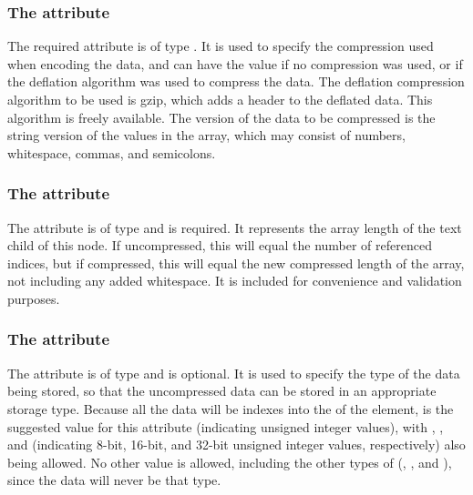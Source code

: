 \subsubsection{The \fixttspace{} attribute}
The required  attribute is of type . It is used to specify the compression used when encoding the data, and can have the value  if no compression was used, or  if the deflation algorithm was used to compress the data.  The deflation compression algorithm to be used is gzip, which adds a header to the deflated data.  This algorithm is freely available.  The version of the data to be compressed is the string version of the values in the array, which may consist of numbers, whitespace, commas, and semicolons.

\subsubsection{The \fixttspace{} attribute}
The  attribute is of type  and is required. It represents the array length of the  text child of this node.  If uncompressed, this will equal the number of referenced indices, but if compressed, this will equal the new compressed length of the array, not including any added whitespace.  It is included for convenience and validation purposes.

\subsubsection{The \fixttspace{} attribute}
The  attribute is of type  and is optional.  It is used to specify the type of the data being stored, so that the uncompressed data can be stored in an appropriate storage type.  Because all the data will be indexes into the  of the \SpatialPoints element,  is the suggested value for this attribute (indicating unsigned integer values), with , , and  (indicating 8-bit, 16-bit, and 32-bit unsigned integer values, respectively) also being allowed.  No other value is allowed, including the other types of  (, , and ), since the data will never be that type.


